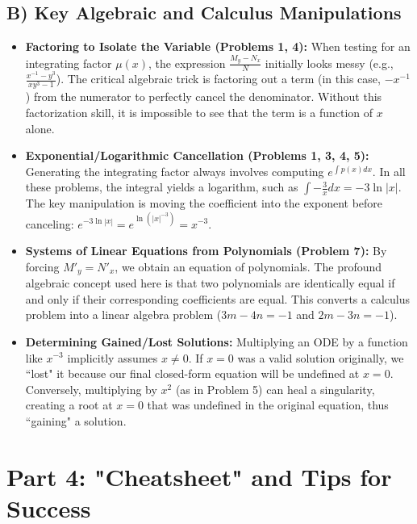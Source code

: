 \documentclass[11pt]{article}
\begin{document}
\subsection{B) Key Algebraic and Calculus Manipulations}
\begin{itemize}
    \item \textbf{Factoring to Isolate the Variable (Problems 1, 4):} When testing for an integrating factor $\mu(x)$, the expression $\frac{M_y - N_x}{N}$ initially looks messy (e.g., $\frac{x^{-1} - y^3}{xy^3 - 1}$). The critical algebraic trick is factoring out a term (in this case, $-x^{-1}$) from the numerator to perfectly cancel the denominator. Without this factorization skill, it is impossible to see that the term is a function of $x$ alone.
    \item \textbf{Exponential/Logarithmic Cancellation (Problems 1, 3, 4, 5):} Generating the integrating factor always involves computing $e^{\int p(x)dx}$. In all these problems, the integral yields a logarithm, such as $\int -\frac{3}{x} dx = -3\ln|x|$. The key manipulation is moving the coefficient into the exponent before canceling: $e^{-3\ln|x|} = e^{\ln(|x|^{-3})} = x^{-3}$.
    \item \textbf{Systems of Linear Equations from Polynomials (Problem 7):} By forcing $M'_y = N'_x$, we obtain an equation of polynomials. The profound algebraic concept used here is that two polynomials are identically equal if and only if their corresponding coefficients are equal. This converts a calculus problem into a linear algebra problem ($3m - 4n = -1$ and $2m - 3n = -1$).
    \item \textbf{Determining Gained/Lost Solutions:} Multiplying an ODE by a function like $x^{-3}$ implicitly assumes $x \neq 0$. If $x=0$ was a valid solution originally, we ``lost" it because our final closed-form equation will be undefined at $x=0$. Conversely, multiplying by $x^2$ (as in Problem 5) can heal a singularity, creating a root at $x=0$ that was undefined in the original equation, thus ``gaining" a solution.
\end{itemize}

\newpage
\section{Part 4: "Cheatsheet" and Tips for Success}
\end{document}
